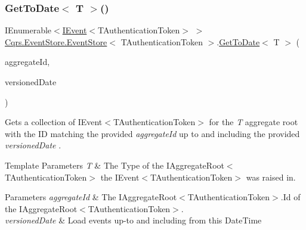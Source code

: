 \mbox{\label{classCqrs_1_1EventStore_1_1EventStore_aaaa0b3c21d7ad3732af466dda82af5b9_aaaa0b3c21d7ad3732af466dda82af5b9}} 
\subsubsection{\texorpdfstring{Get\+To\+Date$<$ T $>$()}{GetToDate< T >()}}
{\footnotesize\ttfamily I\+Enumerable$<$\hyperlink{interfaceCqrs_1_1Events_1_1IEvent}{I\+Event}$<$T\+Authentication\+Token$>$ $>$ \hyperlink{classCqrs_1_1EventStore_1_1EventStore}{Cqrs.\+Event\+Store.\+Event\+Store}$<$ T\+Authentication\+Token $>$.\hyperlink{classCqrs_1_1EventStore_1_1EventStore_ac7208e6397e7f9145dfc03b27a2615b8_ac7208e6397e7f9145dfc03b27a2615b8}{Get\+To\+Date}$<$ T $>$ (\begin{DoxyParamCaption}\item[{Guid}]{aggregate\+Id,  }\item[{Date\+Time}]{versioned\+Date }\end{DoxyParamCaption})}



Gets a collection of I\+Event$<$\+T\+Authentication\+Token$>$ for the {\itshape T} aggregate root with the ID matching the provided {\itshape aggregate\+Id}  up to and including the provided {\itshape versioned\+Date} . 


\begin{DoxyTemplParams}{Template Parameters}
{\em T} & The Type of the I\+Aggregate\+Root$<$\+T\+Authentication\+Token$>$ the I\+Event$<$\+T\+Authentication\+Token$>$ was raised in.\\
\hline
\end{DoxyTemplParams}

\begin{DoxyParams}{Parameters}
{\em aggregate\+Id} & The I\+Aggregate\+Root$<$\+T\+Authentication\+Token$>$.\+Id of the I\+Aggregate\+Root$<$\+T\+Authentication\+Token$>$.\\
\hline
{\em versioned\+Date} & Load events up-\/to and including from this Date\+Time\\
\hline
\end{DoxyParams}


